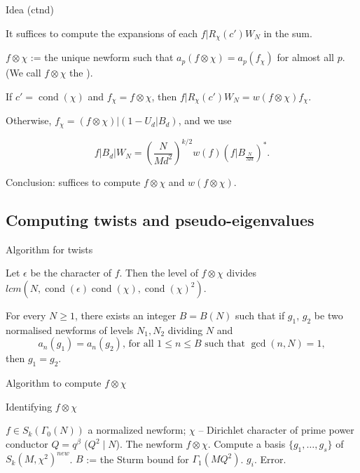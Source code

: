 \documentclass[handout]{beamer}
\DeclareMathOperator{\cond}{cond}
\begin{document}
\begin{frame}{Idea (ctnd)}

It suffices to compute the expansions of  each $f| R_\chi(c') W_N$ in the sum. 

$f \otimes \chi$ :=  the unique newform such that $a_p(f \otimes \chi) = a_p(f_\chi)$ for almost all $p$. 
(We call $f \otimes \chi$ the ).


If $c' = \cond(\chi)$ and $f_\chi = f \otimes \chi$, then  $f| R_\chi(c') W_N = w(f \otimes \chi) f_\chi$. 
\medskip

Otherwise, $f_\chi = (f \otimes \chi) | ( 1 - U_d | B_d)$, and we use 
\begin{Lemma}
   $$f| B_d|W_N = \left(\frac{N}{Md^2} \right)^{k/2}  w(f)  (f|B_{\frac{N}{Md}})^{*}.$$
\end{Lemma} 

\medskip

Conclusion: suffices to compute $f \otimes \chi$ and $w(f \otimes \chi)$.

\end{frame}

\subsection{Computing twists and pseudo-eigenvalues}

\begin{frame}{Algorithm for twists}

\begin{Lemma}
Let $\epsilon$ be the character of $f$. Then the level of $f \otimes \chi$ divides $lcm(N, \cond(\epsilon) \cond(\chi), \cond(\chi)^2)$. 
\end{Lemma}

\begin{Lemma}
For every $N \geq 1$, there exists an integer $B = B(N)$ such that if $g_1$, $g_2$ be two normalised newforms of levels $N_1,N_2$ dividing $N$ and 
\[
	a_n(g_1) = a_n(g_2), \, \mbox{for all }1 \leq n \leq B \mbox{ such that } \gcd(n,N) = 1,
\]
then $g_1 = g_2$.
\end{Lemma}

\end{frame}

\begin{frame}{Algorithm to compute $f \otimes \chi$}
\begin{algorithm}[H]
\caption{Identifying  $f \otimes \chi$}
\label{alg: twist}
\begin{algorithmic}
    \Require $f \in S_k(\Gamma_0(N))$ a normalized newform; 
     $\chi$ -- Dirichlet character of prime power conductor $Q = q^\beta$ ($Q^2 \mid N$). 
    \Ensure The newform $f \otimes \chi$. 
	\State Compute a basis $\{g_1, \ldots, g_s\}$ of $S_k(M, \chi^2)^{new}$. 
    	\State $B$ := the Sturm bound for $\Gamma_1(MQ^2)$. 
			\State \Return $g_i$.
		\EndIf
	\EndFor
   \EndFor
   \State \Return Error.
\end{algorithmic}
\end{algorithm}
\end{frame}
\end{document}
